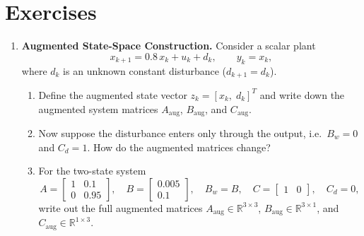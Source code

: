 \section*{Exercises}
\begin{enumerate}
	\item \textbf{Augmented State-Space Construction.}
	Consider a scalar plant
	\[
	x_{k+1} = 0.8\,x_k + u_k + d_k, \qquad y_k = x_k,
	\]
	where \(d_k\) is an unknown constant disturbance (\(d_{k+1}=d_k\)).
	\begin{enumerate}
		\item Define the augmented state vector \(z_k = [x_k,\; d_k]^T\) and write down the augmented system matrices \(A_{\mathrm{aug}}\), \(B_{\mathrm{aug}}\), and \(C_{\mathrm{aug}}\).
		\item Now suppose the disturbance enters only through the output, i.e.\ \(B_w = 0\) and \(C_d = 1\). How do the augmented matrices change?
		\item For the two-state system
		\[
		A = \begin{bmatrix} 1 & 0.1 \\ 0 & 0.95 \end{bmatrix}, \quad
		B = \begin{bmatrix} 0.005 \\ 0.1 \end{bmatrix}, \quad
		B_w = B, \quad
		C = \begin{bmatrix} 1 & 0 \end{bmatrix}, \quad C_d = 0,
		\]
		write out the full augmented matrices \(A_{\mathrm{aug}} \in \mathbb{R}^{3\times 3}\), \(B_{\mathrm{aug}} \in \mathbb{R}^{3\times 1}\), and \(C_{\mathrm{aug}} \in \mathbb{R}^{1\times 3}\).
	\end{enumerate}


\end{enumerate}
